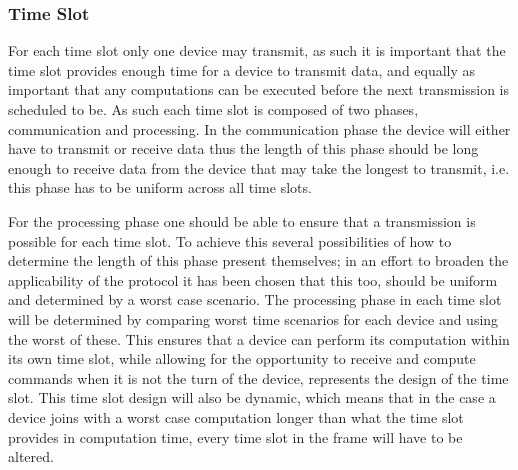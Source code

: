 \subsubsection*{Time Slot}
For each time slot only one device may transmit, as such it is important that the time slot provides enough time for a device to transmit data, and equally as important that any computations can be executed before the next transmission is scheduled to be.
As such each time slot is composed of two phases, communication and processing.
In the communication phase the device will either have to transmit or receive data thus the length of this phase should be long enough to receive data from the device that may take the longest to transmit, i.e. this phase has to be uniform across all time slots.

\bigskip \noindent
For the processing phase one should be able to ensure that a transmission is possible for each time slot.
To achieve this several possibilities of how to determine the length of this phase present themselves; in an effort to broaden the applicability of the protocol it has been chosen that this too, should be uniform and determined by  a worst case scenario.
The processing phase in each time slot will be determined by comparing worst time scenarios for each device and using the worst of these.
This ensures that a device can perform its computation within its own time slot, while allowing for the opportunity to receive and compute commands when it is not the turn of the device,  represents the design of the time slot.
This time slot design will also be dynamic, which means that in the case a device joins with a worst case computation longer than what the time slot provides in computation time, every time slot in the frame will have to be altered.
